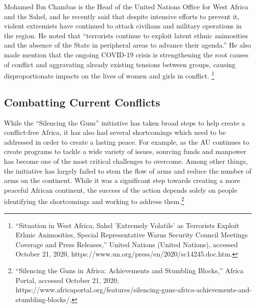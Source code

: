 \documentclass[10pt, letterpaper]{article}
\begin{document}
Mohamed Ibn Chambas is the Head of the United Nations Office for West
Africa and the Sahel, and he recently said that despite intensive
efforts to prevent it, violent extremists have continued to attack
civilians and military operations in the region. He noted that
``terrorists continue to exploit latent ethnic animosities and the
absence of the State in peripheral areas to advance their agenda.'' He
also made mention that the ongoing COVID-19 crisis is strengthening the
root causes of conflict and aggravating already existing tensions
between groups, causing disproportionate impacts on the lives of women
and girls in conflict. \footnote{``Situation in West Africa, Sahel
  'Extremely Volatile' as Terrorists Exploit Ethnic Animosities, Special
  Representative Warns Security Council \textbar{} Meetings Coverage and
  Press Releases,'' United Nations (United Nations), accessed October
  21, 2020, https://www.un.org/press/en/2020/sc14245.doc.htm.} \\

\subsection{Combatting Current Conflicts}

While the ``Silencing the Guns'' initiative has taken broad steps to
help create a conflict-free Africa, it has also had several shortcomings
which need to be addressed in order to create a lasting peace. For
example, as the AU continues to create programs to tackle a wide variety
of issues, sourcing funds and manpower has become one of the most
critical challenges to overcome. Among other things, the initiative has
largely failed to stem the flow of arms and reduce the number of arms on
the continent. While it was a significant step towards creating a more
peaceful African continent, the success of the action depends solely on
people identifying the shortcomings and working to address
them.\footnote{``Silencing the Guns in Africa: Achievements and
  Stumbling Blocks,'' Africa Portal, accessed October 21, 2020,
  https://www.africaportal.org/features/silencing-guns-africa-achievements-and-stumbling-blocks/.}\\
\end{document}
